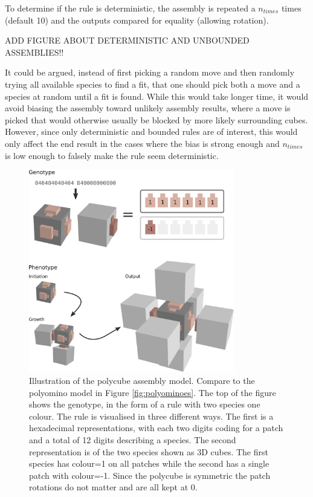 To determine if the rule is deterministic, the assembly is repeated a \(n_{times}\) times (default 10) and the outputs compared for equality (allowing rotation).

ADD FIGURE ABOUT DETERMINISTIC AND UNBOUNDED ASSEMBLIES!!

It could be argued, instead of first picking a random move and then randomly trying all available species to find a fit, that one should pick both a move and a species at random until a fit is found. While this would take longer time, it would avoid biasing the assembly toward unlikely assembly results, where a move is picked that would otherwise usually be blocked by more likely surrounding cubes. However, since only deterministic and bounded rules are of interest, this would only affect the end result in the cases where the bias is strong enough and \(n_{times}\) is low enough to falsely make the rule seem deterministic.

\begin{figure}
\centering\includegraphics[width=0.8\textwidth]{figures/rule.eps} 
\caption{Illustration of the polycube assembly model. Compare to the polyomino model in Figure \ref{fig:polyominoes}. The top of the figure shows the genotype, in the form of a rule with two species one colour. The rule is visualised in three different ways. The first is a hexadecimal representations, with each two digits coding for a patch and a total of 12 digits describing a species. The second representation is of the two species shown as 3D cubes. The first species has colour=1 on all patches while the second has a single patch with colour=-1. Since the polycube is symmetric the patch rotations do not matter and are all kept at 0.}
\label{fig:polycubeRule}\end{figure}

